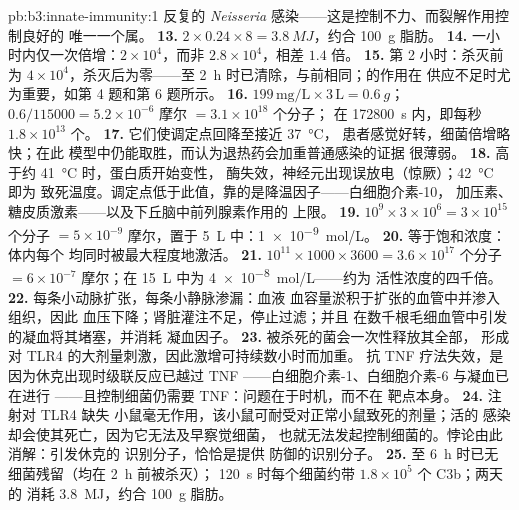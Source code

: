 \begin{solution}{pb:b3:innate-immunity:1}
反复的 \emph{Neisseria} 感染——这是控制不力、而裂解作用控制良好的
唯一一个属。
\textbf{13.} $2\times 0.24\times 8 = \qty{3.8}{MJ}$，约合 \qty{100}{g}
脂肪。
\textbf{14.} 一小时内仅一次倍增：$2\times 10^{4}$，而非
$2.8\times 10^{4}$，相差 $1.4$ 倍。
\textbf{15.} 第 2 小时：杀灭前为 $4\times 10^{4}$，杀灭后为零——至
\qty{2}{h} 时已清除，与前相同；的作用在
供应不足时尤为重要，如第 4 题和第 6 题所示。
\textbf{16.} $199\,\text{mg/L}\times 3\,\text{L} = \qty{0.6}{g}$；$0.6/
\num{115000} = 5.2\times 10^{-6}$ 摩尔 $= 3.1\times 10^{18}$ 个分子；
在 \qty{172800}{s} 内，即每秒 $1.8\times 10^{13}$ 个。
\textbf{17.} 它们使调定点回降至接近 \qty{37}{\celsius}，
患者感觉好转，细菌倍增略快；在此
模型中仍能取胜，而认为退热药会加重普通感染的证据
很薄弱。
\textbf{18.} 高于约 \qty{41}{\celsius} 时，蛋白质开始变性，
酶失效，神经元出现误放电（惊厥）；\qty{42}{\celsius} 即为
致死温度。调定点低于此值，靠的是降温因子——白细胞介素-10，
加压素、糖皮质激素——以及下丘脑中前列腺素作用的
上限。
\textbf{19.} $10^{9}\times 3\times 10^{6} = 3\times 10^{15}$ 个分子
$= 5\times 10^{-9}$ 摩尔，置于 \qty{5}{L} 中：\qty{1e-9}{mol/L}。
\textbf{20.} 等于饱和浓度：体内每个
均同时被最大程度地激活。
\textbf{21.} $10^{11}\times 1000\times 3600 = 3.6\times 10^{17}$ 个分子
$= 6\times 10^{-7}$ 摩尔；在 \qty{15}{L} 中为 \qty{4e-8}{mol/L}——约为
活性浓度的四千倍。
\textbf{22.} 每条小动脉扩张，每条小静脉渗漏：血液
血容量淤积于扩张的血管中并渗入组织，因此
血压下降；肾脏灌注不足，停止过滤；并且
在数千根毛细血管中引发的凝血将其堵塞，并消耗
凝血因子。
\textbf{23.} 被杀死的菌会一次性释放其全部，
形成对 TLR4 的大剂量刺激，因此激增可持续数小时而加重。
抗 TNF 疗法失效，是因为休克出现时级联反应已越过 TNF
——白细胞介素-1、白细胞介素-6 与凝血已在进行
——且控制细菌仍需要 TNF：问题在于时机，而不在
靶点本身。
\textbf{24.} 注射对 TLR4 缺失
小鼠毫无作用，该小鼠可耐受对正常小鼠致死的剂量；活的
感染却会使其死亡，因为它无法及早察觉细菌，
也就无法发起控制细菌的。悖论由此消解：引发休克的
识别分子，恰恰是提供
防御的识别分子。
\textbf{25.} 至 \qty{6}{h} 时已无细菌残留（均在 \qty{2}{h} 前被杀灭）；
\qty{120}{s} 时每个细菌约带 $1.8\times 10^{5}$ 个 C3b；两天的
消耗 \qty{3.8}{MJ}，约合 \qty{100}{g} 脂肪。
\end{solution}
